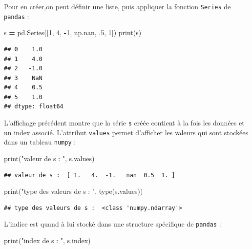\documentclass[12pt,]{book}
\newenvironment{Shaded}{\begin{snugshade}}{\end{snugshade}}
\newcommand{\DecValTok}[1]{\textcolor[rgb]{0.00,0.00,0.81}{#1}}
\newcommand{\StringTok}[1]{\textcolor[rgb]{0.31,0.60,0.02}{#1}}
\newcommand{\OperatorTok}[1]{\textcolor[rgb]{0.81,0.36,0.00}{\textbf{#1}}}
\newcommand{\BuiltInTok}[1]{#1}
\newcommand{\NormalTok}[1]{#1}
\numberwithin{equation}{section}
\numberwithin{countremarque}{section}
\begin{document}
Pour en créer,on peut définir une liste, puis appliquer la fonction
\texttt{Series} de \texttt{pandas} :

\begin{Shaded}
\begin{Highlighting}[]
\NormalTok{s }\OperatorTok{=}\NormalTok{ pd.Series([}\DecValTok{1}\NormalTok{, }\DecValTok{4}\NormalTok{, }\OperatorTok{-}\DecValTok{1}\NormalTok{, np.nan, .}\DecValTok{5}\NormalTok{, }\DecValTok{1}\NormalTok{])}
\BuiltInTok{print}\NormalTok{(s)}
\end{Highlighting}
\end{Shaded}

\begin{lstlisting}
## 0    1.0
## 1    4.0
## 2   -1.0
## 3    NaN
## 4    0.5
## 5    1.0
## dtype: float64
\end{lstlisting}

L'affichage précédent montre que la série \texttt{s} créée contient à la
fois les données et un index associé. L'attribut \texttt{values} permet
d'afficher les valeurs qui sont stockées dans un tableau \texttt{numpy}
:

\begin{Shaded}
\begin{Highlighting}[]
\BuiltInTok{print}\NormalTok{(}\StringTok{"valeur de s : "}\NormalTok{, s.values)}
\end{Highlighting}
\end{Shaded}

\begin{lstlisting}
## valeur de s :  [ 1.   4.  -1.   nan  0.5  1. ]
\end{lstlisting}

\begin{Shaded}
\begin{Highlighting}[]
\BuiltInTok{print}\NormalTok{(}\StringTok{"type des valeurs de s : "}\NormalTok{, }\BuiltInTok{type}\NormalTok{(s.values))}
\end{Highlighting}
\end{Shaded}

\begin{lstlisting}
## type des valeurs de s :  <class 'numpy.ndarray'>
\end{lstlisting}

L'indice est quand à lui stocké dans une structure spécifique de
\texttt{pandas} :

\begin{Shaded}
\begin{Highlighting}[]
\BuiltInTok{print}\NormalTok{(}\StringTok{"index de s : "}\NormalTok{, s.index)}
\end{Highlighting}
\end{Shaded}
\end{document}
